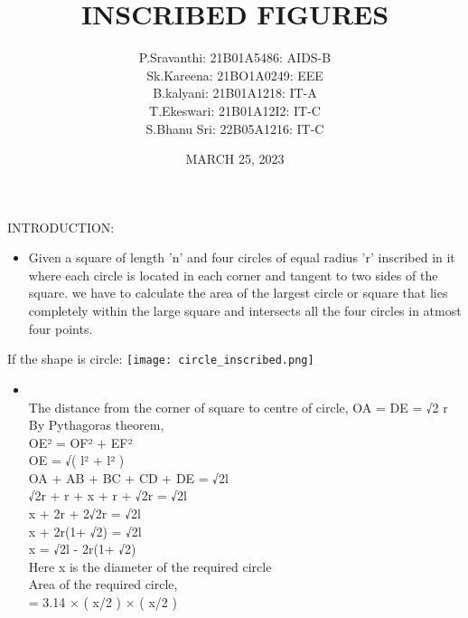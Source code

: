 \documentclass[10pt]{beamer}
\title[]{INSCRIBED FIGURES}
\author[]{P.Sravanthi: 21B01A5486: AIDS-B\\ \vspace{4} Sk.Kareena: 21BO1A0249:
EEE\\ \vspace{4}B.kalyani: 21B01A1218: IT-A\\ \vspace{4} T.Ekeswari:
21B01A12I2: IT-C\\ \vspace{4} S.Bhanu Sri: 22B05A1216: IT-C}
\date[]
{MARCH 25, 2023}
\begin{document}
\frame{\titlepage}
\begin{frame}{INTRODUCTION: }
\begin{itemize}
\item Given a square of length 'n' and four circles of equal radius 'r' inscribed in it where
each circle is located in each corner and tangent to two sides of the square. we have to
calculate the area of the largest circle or square that lies completely within the large square and
intersects all the four circles in atmost four points.
\end{itemize}
\end{frame}
\begin{frame}{If the shape is circle:}
\texttt{[image: circle\_inscribed.png]}
\begin{wrapfigure}{\hspace{10} }{\textwidth}
\caption{}
\label{fig:wrapfig}
\end{wrapfigure}
\begin{itemize}
\item \\
The distance from the corner of square to centre of circle,
OA = DE = √2 r \\ By Pythagoras theorem, \\ OE² = OF² + EF² \\
OE = √( l² + l² ) \\
OA + AB + BC + CD + DE = √2l
\\ √2r + r + x + r + √2r = √2l \\
x + 2r + 2√2r = √2l \\
x + 2r(1+ √2) = √2l \\
x = √2l - 2r(1+ √2) \\
Here x is the diameter of the required circle \\
Area of the required circle, \\
\hspace{17} = 3.14 × ( x/2 ) × ( x/2 )
\end{itemize}
\end{frame}
\end{document}
